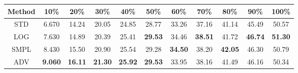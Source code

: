 \documentclass{standalone}
\begin{document}
\begin{tabular}{c|cccccccccc}
      \toprule
      Method & 10\% & 20\% & 30\% & 40\% & 50\% & 60\% & 70\% & 80\% & 90\% & 100\% \\
      \midrule
STD & 6.670 & 14.24 & 20.05 & 24.85 & 28.77 & 33.26 & 37.16 & 41.14 & 45.49 & 50.57\\
LOG & 7.630 & 14.89 & 20.39 & 25.41 & \textbf{29.53} & 34.46 & \textbf{38.51} & 41.72 & \textbf{46.74} & \textbf{51.30}\\
SMPL & 8.430 & 15.50 & 20.90 & 25.54 & 29.28 & \textbf{34.50} & 38.20 & \textbf{42.05} & 46.30 & 50.79\\
ADV & \textbf{9.060} & \textbf{16.11} & \textbf{21.30} & \textbf{25.92} & \textbf{29.53} & 33.95 & 38.16 & 41.49 & 46.16 & 50.34\\
  \bottomrule
\end{tabular}
\end{document}
